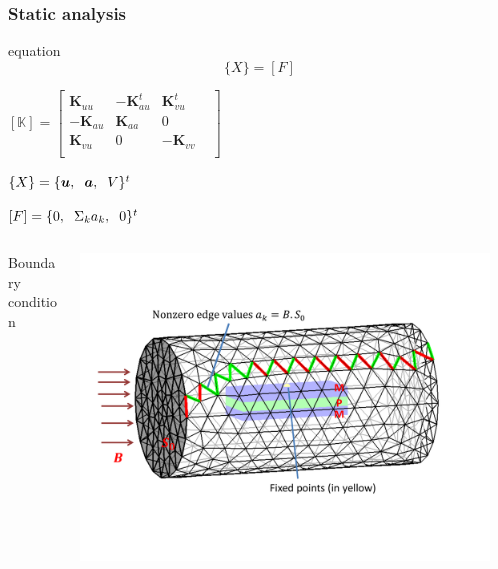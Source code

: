 \documentclass[compress]{beamer}
\begin{document}
\begin{frame}\frametitle{Static analysis}
\begin{beamercolorbox}[center]{equation}
      \begin{equation*}
		[\mathbb{K}] \{ X \}=[F]
		\end{equation*}
\end{beamercolorbox}
\begin{itemize} [label=$\bullet$, font=\small, leftmargin=*]
\begin{minipage}{0.53\linewidth}
\item  $ 
[\mathbb{K}] = \begin{bmatrix}
       \boldsymbol{K}_{uu}  & -\boldsymbol{K}^t_{au} & \boldsymbol{K}^t_{vu}          \\[0.3em]
       -\boldsymbol{K}_{au} & \boldsymbol{K}_{aa}           & 0 \\[0.3em]
       \boldsymbol{K}_{vu}         & 0 & -\boldsymbol{K}_{vv} &  \\
     \end{bmatrix}
$
\end{minipage}
\begin{minipage}{0.4\linewidth}
\item $\{ X \} = \{\boldsymbol{u},\hspace{0.2cm} \boldsymbol{a},\hspace{0.2cm} V \}^t$
\item $[F] = \{0, \hspace{0.2cm} \Sigma_k a_k, \hspace{0.2cm} 0 \}^t$
\end{minipage}
\end{itemize}
\begin{columns}[totalwidth=\textwidth] 
   \begin{column}{.25\textwidth}
   Boundary condition
   \end{column}
    \begin{column}{.75\textwidth}
	\includegraphics[width=0.95\textwidth]{Graphic/02_illusbdc.pdf}

\end{column}
\end{columns}
\end{frame}
\end{document}
